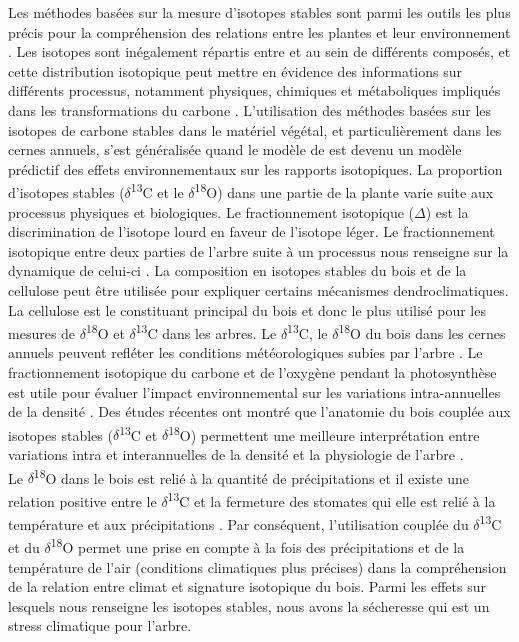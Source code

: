 \documentclass{report}
\newcommand{\Ctreize}{$\delta$\textsuperscript{13}C\xspace}
\newcommand{\Odixhuit}{$\delta$\textsuperscript{18}O\xspace}
\begin{document}
Les méthodes basées sur la mesure d'isotopes stables sont parmi les outils les plus précis pour la compréhension des relations entre les plantes et leur environnement \citep{Dawson2002}. Les isotopes sont inégalement répartis entre et au sein de différents composés, et cette distribution isotopique peut mettre en évidence des informations sur différents processus, notamment physiques, chimiques et métaboliques impliqués dans les transformations du carbone \citep{Farquhar1989}. L'utilisation des méthodes basées sur les isotopes de carbone stables dans le matériel végétal, et particulièrement dans les cernes annuels, s'est généralisée quand le modèle de \cite{Farquhar1989} est devenu un modèle prédictif des effets environnementaux sur les rapports isotopiques. La proportion d'isotopes stables (\Ctreize et le \Odixhuit) dans une partie de la plante varie suite aux processus physiques et biologiques. Le fractionnement isotopique ($\Delta$) est la discrimination de l'isotope lourd en faveur de l'isotope léger. Le fractionnement isotopique entre deux parties de l'arbre suite à un processus nous renseigne sur la dynamique de celui-ci \citep{Farquhar1989}. La composition en isotopes stables du bois et de la cellulose peut être utilisée pour expliquer certains mécanismes dendroclimatiques. La cellulose est le constituant principal du bois et donc le plus utilisé pour les mesures de \Odixhuit et \Ctreize dans les arbres. Le \Ctreize, le \Odixhuit du bois dans les cernes annuels peuvent refléter les conditions météorologiques subies par l'arbre \citep{Duquesnay1998,McCarroll2004,Hartl-meier2015}. Le fractionnement isotopique du carbone et de l'oxygène pendant la photosynthèse est utile pour évaluer l'impact environnemental sur les variations intra-annuelles de la densité \citep{Farquhar1989,JonLloyd1994}. Des études récentes ont montré que l'anatomie du bois couplée aux isotopes stables (\Ctreize et \Odixhuit) permettent une meilleure interprétation entre variations intra et interannuelles de la densité et la physiologie de l'arbre \citep{Micco2007,Vaganov2009,Sarris2013}. \\

Le \Odixhuit dans le bois est relié à la quantité de précipitations \citep{Bonal2000} et il existe une relation positive entre le \Ctreize et la fermeture des stomates qui elle est relié à la température et aux précipitations \citep{Pons2011}. Par conséquent, l'utilisation couplée du \Ctreize et du \Odixhuit permet une prise en compte à la fois des précipitations et de la température de l'air (conditions climatiques plus précises) dans la compréhension de la relation entre climat et signature isotopique du bois. Parmi les effets sur lesquels nous renseigne les isotopes stables, nous avons la sécheresse qui est un stress climatique pour l'arbre.\\ 
\end{document}
